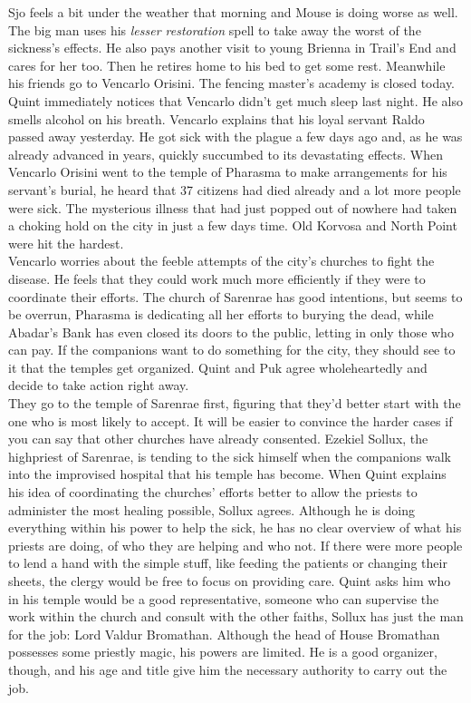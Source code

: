 Sjo feels a bit under the weather that morning and Mouse is doing worse as well. The big man uses his {\itshape lesser restoration} spell to take away the worst of the sickness's effects. He also pays another visit to young Brienna in Trail's End and cares for her too. Then he retires home to his bed to get some rest. Meanwhile his friends go to Vencarlo Orisini. The fencing master's academy is closed today. Quint immediately notices that Vencarlo didn't get much sleep last night. He also smells alcohol on his breath. Vencarlo explains that his loyal servant Raldo passed away yesterday. He got sick with the plague a few days ago and, as he was already advanced in years, quickly succumbed to its devastating effects. When Vencarlo Orisini went to the temple of Pharasma to make arrangements for his servant's burial, he heard that 37 citizens had died already and a lot more people were sick. The mysterious illness that had just popped out of nowhere had taken a choking hold on the city in just a few days time. Old Korvosa and North Point were hit the hardest.\\

Vencarlo worries about the feeble attempts of the city's churches to fight the disease. He feels that they could work much more efficiently if they were to coordinate their efforts. The church of Sarenrae has good intentions, but seems to be overrun, Pharasma is dedicating all her efforts to burying the dead, while Abadar's Bank has even closed its doors to the public, letting in only those who can pay. If the companions want to do something for the city, they should see to it that the temples get organized. Quint and Puk agree wholeheartedly and decide to take action right away.\\

They go to the temple of Sarenrae first, figuring that they'd better start with the one who is most likely to accept. It will be easier to convince the harder cases if you can say that other churches have already consented. Ezekiel Sollux, the highpriest of Sarenrae, is tending to the sick himself when the companions walk into the improvised hospital that his temple has become. When Quint explains his idea of coordinating the churches' efforts better to allow the priests to administer the most healing possible, Sollux agrees. Although he is doing everything within his power to help the sick, he has no clear overview of what his priests are doing, of who they are helping and who not. If there were more people to lend a hand with the simple stuff, like feeding the patients or changing their sheets, the clergy would be free to focus on providing care. Quint asks him who in his temple would be a good representative, someone who can supervise the work within the church and consult with the other faiths, Sollux has just the man for the job: Lord Valdur Bromathan. Although the head of House Bromathan possesses some priestly magic, his powers are limited. He is a good organizer, though, and his age and title give him the necessary authority to carry out the job.\\

